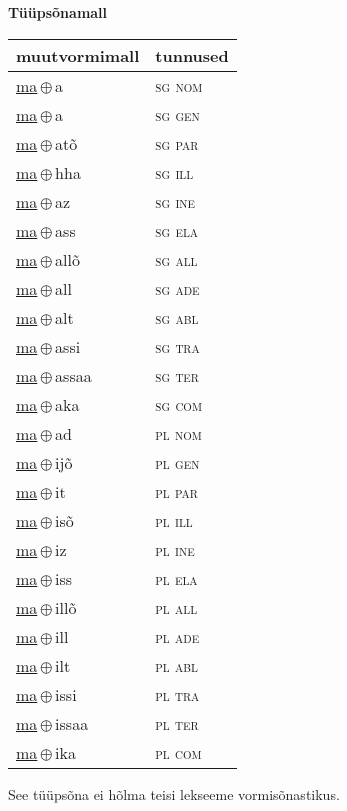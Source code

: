 

\vspace{3.5em}
\noindent \begin{minipage}{\textwidth}
\noindent \textbf{Tüüpsõnamall \,}\\

\begin{sideways}
\begin{tabular}{l l}
muutvormimall & tunnused \\
\hline
\underline{ma}\,$\oplus$\,a & \textsc{ sg nom } \\
\underline{ma}\,$\oplus$\,a & \textsc{ sg gen } \\
\underline{ma}\,$\oplus$\,atõ & \textsc{ sg par } \\
\underline{ma}\,$\oplus$\,hha & \textsc{ sg ill } \\
\underline{ma}\,$\oplus$\,az & \textsc{ sg ine } \\
\underline{ma}\,$\oplus$\,ass & \textsc{ sg ela } \\
\underline{ma}\,$\oplus$\,allõ & \textsc{ sg all } \\
\underline{ma}\,$\oplus$\,all & \textsc{ sg ade } \\
\underline{ma}\,$\oplus$\,alt & \textsc{ sg abl } \\
\underline{ma}\,$\oplus$\,assi & \textsc{ sg tra } \\
\underline{ma}\,$\oplus$\,assaa & \textsc{ sg ter } \\
\underline{ma}\,$\oplus$\,aka & \textsc{ sg com } \\
\underline{ma}\,$\oplus$\,ad & \textsc{ pl nom } \\
\underline{ma}\,$\oplus$\,ijõ & \textsc{ pl gen } \\
\underline{ma}\,$\oplus$\,it & \textsc{ pl par } \\
\underline{ma}\,$\oplus$\,isõ & \textsc{ pl ill } \\
\underline{ma}\,$\oplus$\,iz & \textsc{ pl ine } \\
\underline{ma}\,$\oplus$\,iss & \textsc{ pl ela } \\
\underline{ma}\,$\oplus$\,illõ & \textsc{ pl all } \\
\underline{ma}\,$\oplus$\,ill & \textsc{ pl ade } \\
\underline{ma}\,$\oplus$\,ilt & \textsc{ pl abl } \\
\underline{ma}\,$\oplus$\,issi & \textsc{ pl tra } \\
\underline{ma}\,$\oplus$\,issaa & \textsc{ pl ter } \\
\underline{ma}\,$\oplus$\,ika & \textsc{ pl com } \\
\end{tabular}
\end{sideways}
\label{tab:tüüpsõnamall-maa}

\end{minipage}

 
\vspace{1em}
\noindent See tüüpsõna ei hõlma teisi lekseeme vormi\-sõnastikus.
